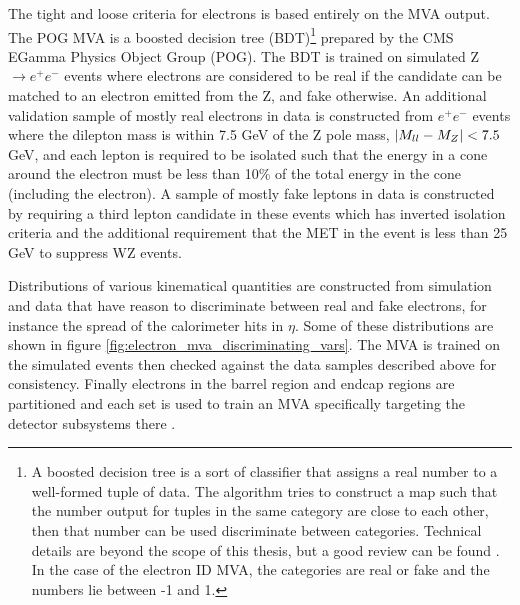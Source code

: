     The tight and loose criteria for electrons is based entirely on the MVA output. The POG MVA is a boosted decision tree (BDT)\footnote{A boosted decision tree is a sort of classifier that assigns a real number to a well-formed tuple of data. The algorithm tries to construct a map such that the number output for tuples in the same category are close to each other, then that number can be used discriminate between categories. Technical details are beyond the scope of this thesis, but a good review can be found . In the case of the electron ID MVA, the categories are real or fake and the numbers lie between -1 and 1.} prepared by the CMS EGamma Physics Object Group (POG). The BDT is trained on simulated Z$\to e^+ e^-$ events where electrons are considered to be real if the candidate can be matched to an electron emitted from the Z, and fake otherwise. An additional validation sample of mostly real electrons in data is constructed from $e^+ e^-$ events where the dilepton mass is within 7.5 GeV of the Z pole mass, $\left| M_{ll} - M_Z \right| < 7.5$ GeV, and each lepton is required to be isolated such that the energy in a cone around the electron must be less than 10\% of the total energy in the cone (including the electron). A sample of mostly fake leptons in data is constructed by requiring a third lepton candidate in these events which has inverted isolation criteria and the additional requirement that the MET in the event is less than 25 GeV to suppress WZ events. 

    Distributions of various kinematical quantities are constructed from simulation and data that have reason to discriminate between real and fake electrons, for instance the spread of the calorimeter hits in $\eta$. Some of these distributions are shown in figure \ref{fig:electron_mva_discriminating_vars}. The MVA is trained on the simulated events then checked against the data samples described above for consistency. Finally electrons in the barrel region and endcap regions are partitioned and each set is used to train an MVA specifically targeting the detector subsystems there \cite{cms_electron_photon_performance}. 

